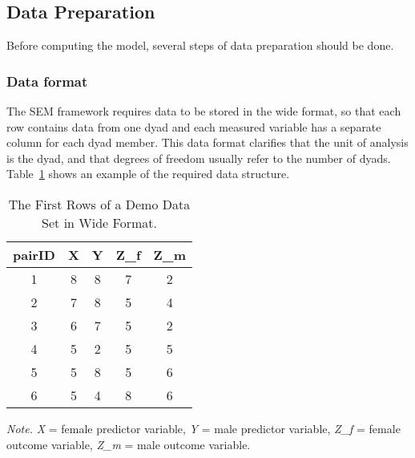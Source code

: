 \documentclass[jou,a4paper,draftfirst]{apa6}
\begin{document}
\subsection{Data Preparation}

Before computing the model, several steps of data preparation should be done.

\subsubsection{Data format}
The SEM framework requires data to be stored in the wide format, so that each row contains data from one dyad and each measured variable has a separate column for each dyad member. This data format clarifies that the unit of analysis is the dyad, and that degrees of freedom usually refer to the number of dyads. Table~\ref{tab:demodata} shows an example of the required data structure.

\begin{table}
    \caption{The First Rows of a Demo Data Set in Wide Format.} 
    \label{tab:demodata}
  \begin{threeparttable}
		\begin{tabular}{ccccc}
		\toprule
	pairID & X & Y & Z\_f & Z\_m \\ 
    \midrule
	1 & 8 & 8 & 7 & 2 \\ 
	  2 & 7 & 8 & 5 & 4 \\ 
	  3 & 6 & 7 & 5 & 2 \\ 
	  4 & 5 & 2 & 5 & 5 \\ 
	  5 & 5 & 8 & 5 & 6 \\ 
	  6 & 5 & 4 & 8 & 6 \\ 
		\bottomrule 
	\end{tabular}
	\vspace{0.5em}
	\begin{tablenotes}
		\footnotesize
		\textit{Note.} \emph{X} = female predictor variable, \emph{Y} = male predictor variable, \emph{Z\_f} = female outcome variable, \emph{Z\_m} = male outcome variable.
		\end{tablenotes}
		\vspace{0.5em}
	\end{threeparttable}
\end{table}
\end{document}
